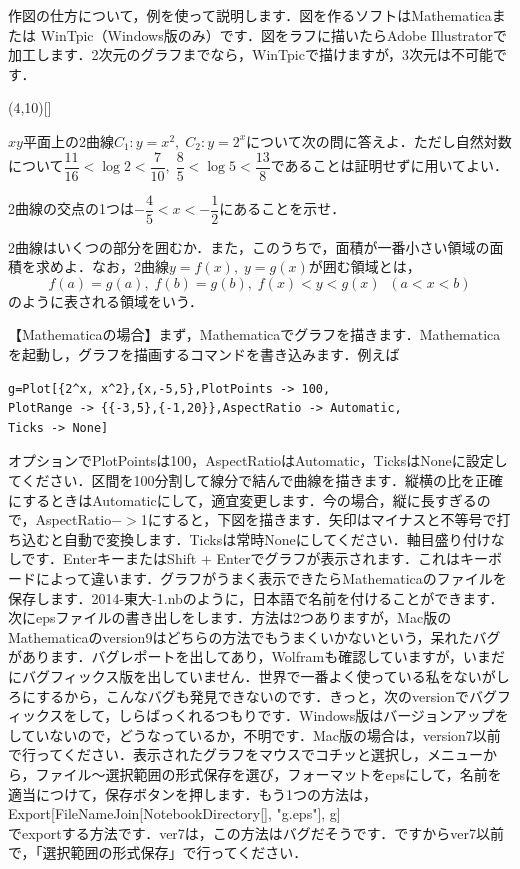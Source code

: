\documentclass [10pt,fleqn,a4paper]{jsarticlek}
\begin{document}
作図の仕方について，例を使って説明します．図を作るソフトはMathematicaまたは
WinTpic（Windows版のみ）です．図をラフに描いたらAdobe Illustratorで加工します．2次元のグラフまでなら，WinTpicで描けますが，3次元は不可能です．
\begin{Mgwaku}(4,10)[]
\begin{reidai}
\lineskip=4pt
\lineskiplimit=4pt
$xy$平面上の2曲線$C_1:y=x^2,\;C_2:y=2^x$について次の問に答えよ．ただし自然対数について$\dfrac{11}{16}<\log 2<\dfrac{7}{10},\;\dfrac{8}{5}<\log 5<\dfrac{13}{8}$であることは証明せずに用いてよい．

\begin{shomonr}
2曲線の交点の1つは$-\dfrac{4}{5}<x<-\dfrac{1}{2}$にあることを示せ．
\end{shomonr}

\begin{shomonr}
2曲線はいくつの部分を囲むか．また，このうちで，面積が一番小さい領域の面積を求めよ．なお，2曲線$y=f(x),\;y=g(x)$が囲む領域とは，
\[
f(a)=g(a),\;f(b)=g(b),\;f(x)<y<g(x)\;\;(a<x<b)
\]
のように表される領域をいう．
\syutten[3000,東大・理科（第1問）]
\end{shomonr}
\end{reidai}

\end{Mgwaku}
\lineskip=4pt
\lineskiplimit=4pt
【{\gt Mathematicaの場合}】まず，Mathematicaでグラフを描きます．Mathematicaを起動し，グラフを描画するコマンドを書き込みます．例えば
\begin{verbatim}
g=Plot[{2^x, x^2},{x,-5,5},PlotPoints -> 100,
PlotRange -> {{-3,5},{-1,20}},AspectRatio -> Automatic,
Ticks -> None]
\end{verbatim}

オプションでPlotPointsは100，AspectRatioはAutomatic，TicksはNoneに設定してください．区間を100分割して線分で結んで曲線を描きます．縦横の比を正確にするときはAutomaticにして，適宜変更します．今の場合，縦に長すぎるので，AspectRatio$->$1にすると，下図を描きます．矢印はマイナスと不等号で打ち込むと自動で変換します．Ticksは常時Noneにしてください．軸目盛り付けなしです．EnterキーまたはShift + Enterでグラフが表示されます．これはキーボードによって違います．グラフがうまく表示できたらMathematicaのファイルを保存します．2014-東大-1.nbのように，日本語で名前を付けることができます．\\
次にepsファイルの書き出しをします．方法は2つありますが，Mac版のMathematicaのversion9はどちらの方法でもうまくいかないという，呆れたバグがあります．バグレポートを出してあり，Wolframも確認していますが，いまだにバグフィックス版を出していません．世界で一番よく使っている私をないがしろにするから，こんなバグも発見できないのです．きっと，次のversionでバグフィックスをして，しらばっくれるつもりです．Windows版はバージョンアップをしていないので，どうなっているか，不明です．Mac版の場合は，version7以前で行ってください．表示されたグラフをマウスでコチッと選択し，メニューから，ファイル〜選択範囲の形式保存を選び，フォーマットをepsにして，名前を適当につけて，保存ボタンを押します．もう1つの方法は，\\
Export[FileNameJoin[{NotebookDirectory[], "g.eps"}], g]
\\
でexportする方法です．ver7は，この方法はバグだそうです．ですからver7以前で，「選択範囲の形式保存」で行ってください．
\end{document}
